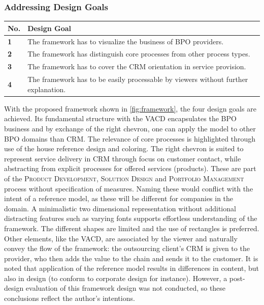 	 \subsubsection{Addressing  Design Goals}
	 	\label{sec:frdg2}
	 	 	\begin{table}[caption={Design Goals}, label={tab:desobj}]
	 	\centering
	 	\begin{tabular}{l p{13.3cm}}
	 		
	 		\textbf{No. }&\textbf{ Design Goal}
	 		\\ \hline
	 		\textbf{1 }                        & The framework has to visualize the business of BPO providers.                                     \\ \hline
	 		\textbf{2}                         & The framework has distinguish core processes from other process types.                                                                                                                   \\ \hline
	 		\textbf{3 }                        & The framework has to cover the CRM orientation in service provision. \\ \hline
	 		\textbf{4}                         & The framework has to be easily processable by viewers without further explanation.                                                              
	 		
	 	\end{tabular}
	 \end{table}
 
	 
	 With the proposed framework shown in \Fig \ref{fig:framework}, the four design goals are achieved. Its fundamental structure with the \acrshort{VACD} encapsulates the BPO business and by exchange of the right chevron, one can apply the model to other BPO domains than \acrshort{CRM}. The relevance of core processes is highlighted through use of the house reference design and coloring. The right chevron is suited to represent service delivery in \acrshort{CRM} through focus on customer contact, while abstracting from explicit processes for offered services (products). These are part of the \textsc{Product Development}, \textsc{Solution Design} and \textsc{Portfolio Management} process without specification of measures. Naming these would conflict with the intent of a reference model, as these will be different for companies in the domain. A minimalistic two dimensional representation without additional distracting features such as  varying fonts supports effortless understanding of the framework. The different shapes are limited and the use of rectangles is preferred. Other elements, like the \acrshort{VACD}, are associated by the viewer and naturally convey the flow of the framework: the outsourcing client's \acrshort{CRM} is given to the provider, who then adds the value to the chain and sends it to the customer. It is noted that application of the reference model results in differences in content, but also in design (to conform to corporate design for instance). However, a post-design evaluation of this framework design was not conducted, so these conclusions reflect the author's intentions.
	 
